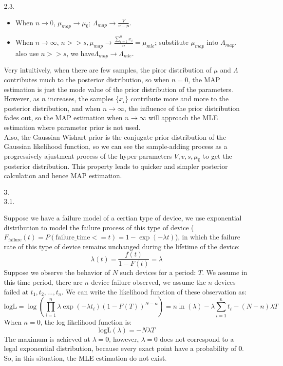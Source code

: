 \documentclass{article}
\theoremstyle{definition}
\theoremstyle{definition}
\theoremstyle{remark}
\begin{document}
2.3.
\begin{addmargin}[3em]{2em}
  \begin{itemize}
  \item When $n \rightarrow 0$, $\mu_{map} \rightarrow \mu_0$; $\Lambda_{map} \rightarrow \frac{V}{v-p}$.
  \item When $n \rightarrow \infty$, $n >> s, \mu_{map} \rightarrow \frac{\sum_{i=1}^n x_i}{n} = \mu_{mle}$; substitute $\mu_{map}$ into $\Lambda_{map}$, also use $n>>s$, we have$\Lambda_{map} \rightarrow \Lambda_{mle}$.
  \end{itemize}
      Very intuitively, when there are few samples, the piror distribution of $\mu$ and $\Lambda$ contributes much to the posterior distribution, so when $n = 0$, the MAP estimation is just the mode value of the prior distribution of the parameters. However, as $n$ increases, the samples $\{x_i\}$ contribute more and more to the posterior distribution, and when $n \rightarrow \infty$, the influence of the prior distribution fades out, so the MAP estimation when $n \rightarrow \infty$ will approach the MLE estimation where parameter prior is not used.\\

      Also, the Gaussian-Wishart prior is the conjugate prior distribution of the Gaussian likelihood function, so we can see the sample-adding process as a progressively ajustment process of the hyper-parameters $V, v, s, \mu_0$ to get the posterior distribution. This property leads to quicker and simpler posterior calculation and hence MAP estimation.
\end{addmargin}

3.\\
3.1.

\begin{addmargin}[3em]{2em}
  Suppose we have a failure model of a certian type of device, we use exponential distribution to model the failure process of this type of device ($F_{\mbox{failure}}(t) = P(\mbox{failure\_time} <= t) = 1 - \exp(-\lambda t)$), in which the failure rate of this type of device remains unchanged during the lifetime of the device:
  \[
  \lambda(t) = \frac{f(t)}{1 - F(t)} = \lambda
  \]
    Suppose we observe the behavior of $N$ such devices for a period: $T$. We assume in this time period, there are $n$ device failure observed, we assume the $n$ devices failed at $t_1, t_2, \dots, t_n$. We can write the likelihood function of these observation as:
  \[
  \mbox{logL} = \log(\prod_{i=1}^n \lambda \exp(-\lambda t_i) {(1-F(T))}^{N-n}) = n \ln(\lambda) - \lambda \sum_{i=1}^n t_i - (N-n) \lambda T
  \]
  When $n = 0$, the log likelihood function is:
  \[
  \mbox{logL}(\lambda) = - N \lambda T
  \]
  The maximum is achieved at $\lambda = 0$, however, $\lambda = 0$ does not correspond to a legal exponential distribution, because every exact point have a probability of 0. So, in this situation, the MLE estimation do not exist.
\end{addmargin}
\end{document}
